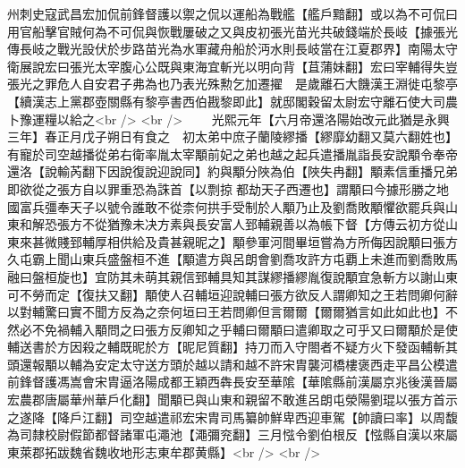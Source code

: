 州刺史寇武昌宏加侃前鋒督護以禦之侃以運船為戰艦【艦戶黯翻】或以為不可侃曰用官船擊官賊何為不可侃與恢戰屢破之又與皮初張光苗光共破錢端於長岐【據張光傳長岐之戰光設伏於步路苗光為水軍藏舟船於沔水則長岐當在江夏郡界】南陽太守衛展說宏曰張光太宰腹心公既與東海宜斬光以明向背【苴蒲妹翻】宏曰宰輔得失豈張光之罪危人自安君子弗為也乃表光殊勲乞加遷擢　是歲離石大饑漢王淵徙屯黎亭【續漢志上黨郡壺關縣有黎亭書西伯戡黎即此】就邸閣穀留太尉宏守離石使大司農卜豫運糧以給之<br />
<br />
　　光熙元年【六月帝還洛陽始改元此猶是永興三年】春正月戊子朔日有食之　初太弟中庶子蘭陵繆播【繆靡幼翻又莫六翻姓也】有寵於司空越播從弟右衛率胤太宰顒前妃之弟也越之起兵遣播胤詣長安說顒令奉帝還洛【說輸芮翻下因說復說迎說同】約與顒分陜為伯【陜失冉翻】顒素信重播兄弟即欲從之張方自以罪重恐為誅首【以剽掠都劫天子西遷也】謂顒曰今據形勝之地國富兵彊奉天子以號令誰敢不從柰何拱手受制於人顒乃止及劉喬敗顒懼欲罷兵與山東和解恐張方不從猶豫未决方素與長安富人郅輔親善以為帳下督【方傳云初方從山東來甚微賤郅輔厚相供給及貴甚親昵之】顒參軍河間畢垣嘗為方所侮因說顒曰張方久屯霸上聞山東兵盛盤桓不進【顒遣方與呂朗會劉喬攻許方屯覇上未進而劉喬敗馬融曰盤桓旋也】宜防其未萌其親信郅輔具知其謀繆播繆胤復說顒宜急斬方以謝山東可不勞而定【復扶又翻】顒使人召輔垣迎說輔曰張方欲反人謂卿知之王若問卿何辭以對輔驚曰實不聞方反為之奈何垣曰王若問卿但言爾爾【爾爾猶言如此如此也】不然必不免禍輔入顒問之曰張方反卿知之乎輔曰爾顒曰遣卿取之可乎又曰爾顒於是使輔送書於方因殺之輔既昵於方【昵尼質翻】持刀而入守閤者不疑方火下發函輔斬其頭還報顒以輔為安定太守送方頭於越以請和越不許宋胄襲河橋樓褒西走平昌公模遣前鋒督護馮嵩會宋胄逼洛陽成都王穎西犇長安至華隂【華隂縣前漢屬京兆後漢晉屬宏農郡唐屬華州華戶化翻】聞顒已與山東和親留不敢進呂朗屯滎陽劉琨以張方首示之遂降【降戶江翻】司空越遣祁宏宋胄司馬纂帥鮮卑西迎車駕【帥讀曰率】以周馥為司隸校尉假節都督諸軍屯澠池【澠彌兖翻】三月惤令劉伯根反【惤縣自漢以來屬東萊郡拓跋魏省魏收地形志東牟郡黄縣】<br />
<br />
